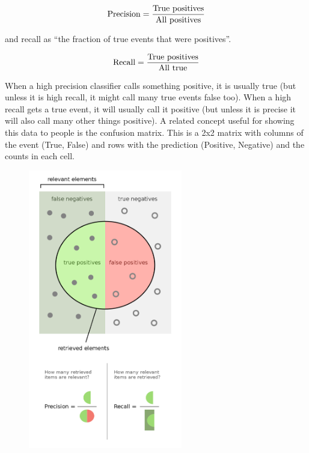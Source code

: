 \documentclass{article}
\begin{document}
\begin{equation}
    {\rm Precision} = \frac{\rm True\ positives}{\rm All\ positives}
\end{equation}

\noindent
and recall as ``the fraction of true events that were positives''.

\begin{equation}
    {\rm Recall} = \frac{\rm True\ positives}{\rm All\ true}
\end{equation}

When a high precision classifier calls something positive, it is usually true (but unless it is high recall, it might call many true events false too).
When a high recall gets a true event, it will usually call it positive (but unless it is precise it will also call many other things positive).
A related concept useful for showing this data to people is the confusion matrix. This is a 2x2 matrix with columns of the event (True, False) and rows with the prediction (Positive, Negative) and the counts in each cell.

\begin{figure}[h!]
    \centering
    \href{https://en.wikipedia.org/wiki/Precision_and_recall}{
        \includegraphics[width=0.6\textwidth]{./figures/PrecisionRecall.png}
    }
\end{figure}
\end{document}
